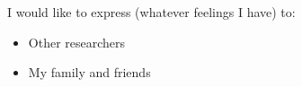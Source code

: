 \cleardoublepage
{}
{}
\begin{thesisacknowledgements}


I would like to express (whatever feelings I have) to:

\begin{itemize}
 \item Other researchers
 \vspace*{3mm}
 \item My family and friends
\end{itemize}

\end{thesisacknowledgements}
